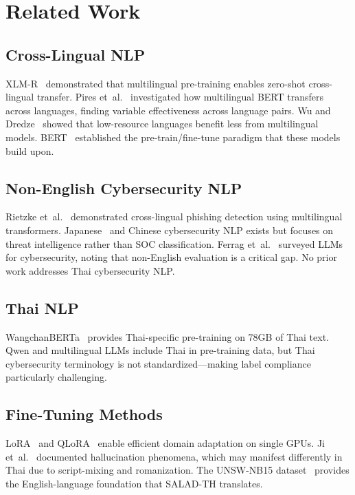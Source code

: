 \documentclass[journal]{IEEEtran}
\begin{document}
\section{Related Work}

\subsection{Cross-Lingual NLP}
XLM-R~\cite{conneau2020} demonstrated that multilingual pre-training enables zero-shot cross-lingual transfer. Pires et~al.~\cite{pires2019} investigated how multilingual BERT transfers across languages, finding variable effectiveness across language pairs. Wu and Dredze~\cite{wu2020} showed that low-resource languages benefit less from multilingual models. BERT~\cite{devlin2019} established the pre-train/fine-tune paradigm that these models build upon.

\subsection{Non-English Cybersecurity NLP}
Rietzke et~al.~\cite{rietzke2023} demonstrated cross-lingual phishing detection using multilingual transformers. Japanese~\cite{nguyen2024} and Chinese cybersecurity NLP exists but focuses on threat intelligence rather than SOC classification. Ferrag et~al.~\cite{ferrag2024} surveyed LLMs for cybersecurity, noting that non-English evaluation is a critical gap. No prior work addresses Thai cybersecurity NLP.

\subsection{Thai NLP}
WangchanBERTa~\cite{lowphansirikul2021} provides Thai-specific pre-training on 78GB of Thai text. Qwen and multilingual LLMs include Thai in pre-training data, but Thai cybersecurity terminology is not standardized---making label compliance particularly challenging.

\subsection{Fine-Tuning Methods}
LoRA~\cite{hu2022} and QLoRA~\cite{dettmers2023} enable efficient domain adaptation on single GPUs. Ji et~al.~\cite{ji2023} documented hallucination phenomena, which may manifest differently in Thai due to script-mixing and romanization. The UNSW-NB15 dataset~\cite{moustafa2016} provides the English-language foundation that SALAD-TH translates.
\end{document}
